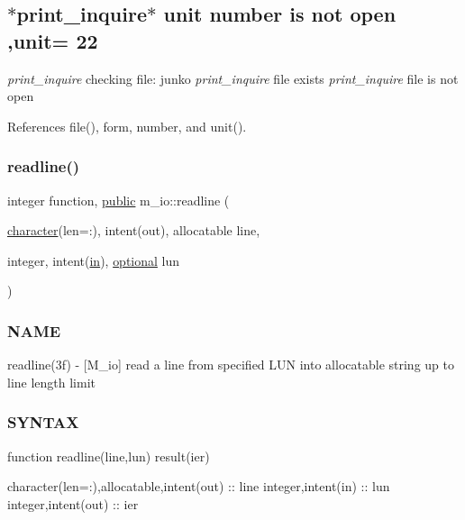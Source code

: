 \subsection*{$\ast$print\+\_\+inquire$\ast$ unit number is not open ,unit= 22 }

{\itshape print\+\_\+inquire} checking file\+: junko {\itshape print\+\_\+inquire} file exists {\itshape print\+\_\+inquire} file is not open 

References file(), form, number, and unit().

\mbox{\label{namespacem__io_a8d9ee59e21830662fa59c300ca23e04b}} 
\subsubsection{\texorpdfstring{readline()}{readline()}}
{\footnotesize\ttfamily integer function, \hyperlink{M__stopwatch_83_8txt_a2f74811300c361e53b430611a7d1769f}{public} m\+\_\+io\+::readline (\begin{DoxyParamCaption}\item[{\hyperlink{option__stopwatch_83_8txt_abd4b21fbbd175834027b5224bfe97e66}{character}(len=\+:), intent(out), allocatable}]{line,  }\item[{integer, intent(\hyperlink{M__journal_83_8txt_afce72651d1eed785a2132bee863b2f38}{in}), \hyperlink{option__stopwatch_83_8txt_aa4ece75e7acf58a4843f70fe18c3ade5}{optional}}]{lun }\end{DoxyParamCaption})}



\subsubsection*{N\+A\+ME}

readline(3f) -\/ \mbox{[}M\+\_\+io\mbox{]} read a line from specified L\+UN into allocatable string up to line length limit 

\subsubsection*{S\+Y\+N\+T\+AX}

function readline(line,lun) result(ier)

character(len=\+:),allocatable,intent(out) \+:\+: line integer,intent(in) \+:\+: lun integer,intent(out) \+:\+: ier

